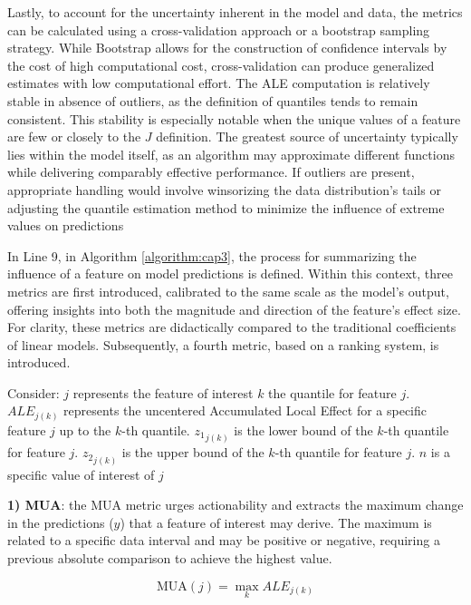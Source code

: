 Lastly, to account for the uncertainty inherent in the model and data, the metrics can be calculated using a cross-validation approach or a bootstrap sampling strategy. While Bootstrap allows for the construction of confidence intervals by the cost of high computational cost, cross-validation can produce generalized estimates with low computational effort. The \gls{ALE} computation is relatively stable in absence of outliers, as the definition of quantiles tends to remain consistent. This stability is especially notable when the unique values of a feature are few or closely to the \(J\) definition. The greatest source of uncertainty typically lies within the model itself, as an algorithm may approximate different functions while delivering comparably effective performance. If outliers are present, appropriate handling would involve winsorizing the data distribution's tails or adjusting the quantile estimation method to minimize the influence of extreme values on predictions


In Line 9, in Algorithm \ref{algorithm:cap3}, the process for summarizing the influence of a feature on model predictions is defined. Within this context, three metrics are first introduced, calibrated to the same scale as the model's output, offering insights into both the magnitude and direction of the feature's effect size. For clarity, these metrics are didactically compared to the traditional coefficients of linear models. Subsequently, a fourth metric, based on a ranking system, is introduced.

Consider:
\( j \) represents the feature of interest
\( k \) the quantile for feature \( j \).
\( ALE_{j(k)} \) represents the uncentered Accumulated Local Effect for a specific feature \( j \) up to the \( k \)-th quantile.
\( {z_1}_{j(k)} \) is the lower bound of the \( k \)-th quantile for feature \( j \).
\( {z_2}_{j(k)} \) is the upper bound of the \( k \)-th quantile for feature \( j \).
\( n \) is a specific value of interest of \( j \) 

\textbf{1) \gls{MUA}}: the \gls{MUA} metric urges actionability and extracts the maximum change in the predictions (\(y\)) that a feature of interest may derive. The maximum is related to a specific data interval and may be positive or negative, requiring a previous absolute comparison to achieve the highest value.


\begin{equation}
\label{eq:MUA}
\text{MUA}(j) = \max_{k} ALE_{j(k)}
\end{equation}


